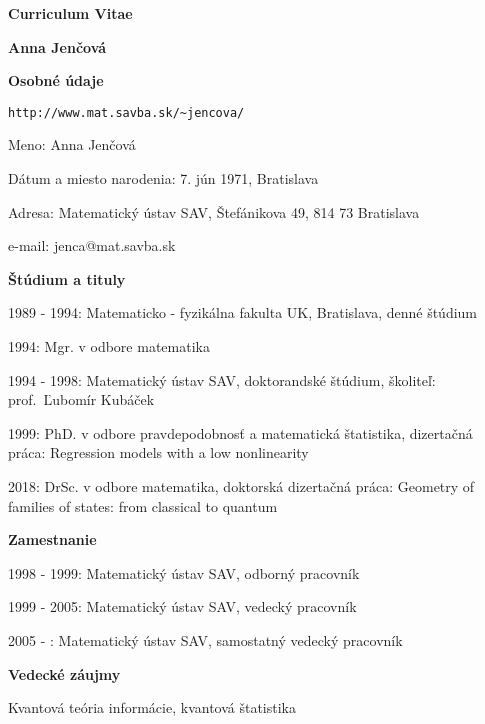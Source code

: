 \documentclass[12pt]{article}
\begin{document}
\centerline{\large \textbf{Curriculum Vitae}}
\vskip 5pt
\centerline{\large \textbf{Anna Jen\v cov\'a}}
\vskip 0.5cm
\noindent
\textbf{Osobné údaje}


\begin{verbatim}http://www.mat.savba.sk/~jencova/\end{verbatim}

\begin{description}[noitemsep,leftmargin=3cm, font=\normalfont]
\item{Meno:} Anna Jen\v cov\'a
\item{Dátum a miesto narodenia:} 7. jún 1971,  Bratislava
\item{Adresa:} Matematický ústav SAV, \v Stef\'anikova 49, 814 73 Bratislava
\item{e-mail:} jenca@mat.savba.sk
\end{description}

\noindent
\textbf{Štúdium a tituly}
\begin{description}[noitemsep,leftmargin=2.6cm, font=\normalfont]
\item{1989 - 1994:} Matematicko - fyzikálna fakulta UK,  Bratislava, denné štúdium 
\item{1994:} Mgr. v odbore matematika
\item{1994 - 1998:} Matematický ústav SAV, doktorandské štúdium, školiteľ: prof.~Ľubomír Kub\'a\v cek
\item{1999:} PhD. v odbore pravdepodobnosť a matematická štatistika, dizertačná práca: Regression models with a low nonlinearity
\item{2018:} DrSc. v odbore matematika, doktorská dizertačná práca: Geometry of families of states: from classical to quantum 

\end{description}

\noindent
\textbf{Zamestnanie}
\begin{description}[noitemsep,leftmargin=3cm, font=\normalfont]
\item{1998 - 1999:} Matematický ústav SAV, odborný pracovník
\item{1999 - 2005:} Matematický ústav SAV, vedecký pracovník
\item{2005 - :} Matematický ústav SAV, samostatný vedecký pracovník
\end{description}

\noindent
\textbf{Vedecké záujmy}
\begin{description}[noitemsep,leftmargin=3cm, font=\normalfont]
\item Kvantová teória informácie, kvantová štatistika
\end{description}
\end{document}
